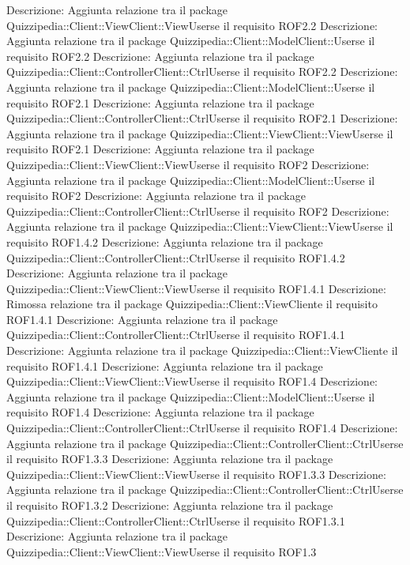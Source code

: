 Descrizione: Aggiunta relazione tra il package Quizzipedia::Client::ViewClient::ViewUserse il requisito ROF2.2 
Descrizione: Aggiunta relazione tra il package Quizzipedia::Client::ModelClient::Userse il requisito ROF2.2 
Descrizione: Aggiunta relazione tra il package Quizzipedia::Client::ControllerClient::CtrlUserse il requisito ROF2.2 
Descrizione: Aggiunta relazione tra il package Quizzipedia::Client::ModelClient::Userse il requisito ROF2.1 
Descrizione: Aggiunta relazione tra il package Quizzipedia::Client::ControllerClient::CtrlUserse il requisito ROF2.1 
Descrizione: Aggiunta relazione tra il package Quizzipedia::Client::ViewClient::ViewUserse il requisito ROF2.1 
Descrizione: Aggiunta relazione tra il package Quizzipedia::Client::ViewClient::ViewUserse il requisito ROF2 
Descrizione: Aggiunta relazione tra il package Quizzipedia::Client::ModelClient::Userse il requisito ROF2 
Descrizione: Aggiunta relazione tra il package Quizzipedia::Client::ControllerClient::CtrlUserse il requisito ROF2 
Descrizione: Aggiunta relazione tra il package Quizzipedia::Client::ViewClient::ViewUserse il requisito ROF1.4.2 
Descrizione: Aggiunta relazione tra il package Quizzipedia::Client::ControllerClient::CtrlUserse il requisito ROF1.4.2 
Descrizione: Aggiunta relazione tra il package Quizzipedia::Client::ViewClient::ViewUserse il requisito ROF1.4.1 
Descrizione: Rimossa relazione tra il package Quizzipedia::Client::ViewCliente il requisito ROF1.4.1 
Descrizione: Aggiunta relazione tra il package Quizzipedia::Client::ControllerClient::CtrlUserse il requisito ROF1.4.1 
Descrizione: Aggiunta relazione tra il package Quizzipedia::Client::ViewCliente il requisito ROF1.4.1 
Descrizione: Aggiunta relazione tra il package Quizzipedia::Client::ViewClient::ViewUserse il requisito ROF1.4 
Descrizione: Aggiunta relazione tra il package Quizzipedia::Client::ModelClient::Userse il requisito ROF1.4 
Descrizione: Aggiunta relazione tra il package Quizzipedia::Client::ControllerClient::CtrlUserse il requisito ROF1.4 
Descrizione: Aggiunta relazione tra il package Quizzipedia::Client::ControllerClient::CtrlUserse il requisito ROF1.3.3 
Descrizione: Aggiunta relazione tra il package Quizzipedia::Client::ViewClient::ViewUserse il requisito ROF1.3.3 
Descrizione: Aggiunta relazione tra il package Quizzipedia::Client::ControllerClient::CtrlUserse il requisito ROF1.3.2 
Descrizione: Aggiunta relazione tra il package Quizzipedia::Client::ControllerClient::CtrlUserse il requisito ROF1.3.1 
Descrizione: Aggiunta relazione tra il package Quizzipedia::Client::ViewClient::ViewUserse il requisito ROF1.3 
